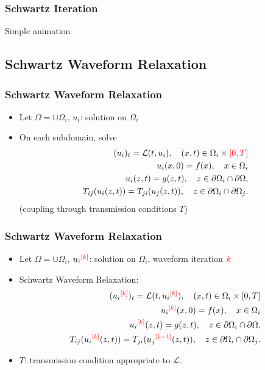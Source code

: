 \documentclass{beamer}
\begin{document}
\begin{frame}
  \frametitle{Schwartz Iteration}
  \vspace*{-0.25in}

  Simple animation

\end{frame}


\subsection{Schwartz Waveform Relaxation}
\begin{frame}
  \frametitle{Schwartz Waveform Relaxation}
  \vspace*{-0.25in}
  \begin{itemize}
  \item Let $\Omega = \cup\Omega_i$, $u_i$: solution on $\Omega_i$
  \item On each subdomain, solve
    \begin{align*}
      (u_i)_t =  \mathcal{L}(t,u_i), \quad (x,t)\in \Omega_i\times{\color{red}[0,T]}\\
      u_i(x,0) = f(x), \quad x \in \Omega_i \\
      u_i(z,t) = g(z,t), \quad z \in \partial\Omega_i\cap\partial\Omega, \\
      {T}_{ij}(u_{i}(z,t)) = {T}_{ji}(u_{j}(z,t)), \quad z \in \partial\Omega_i\cap\partial\Omega_j.
    \end{align*}
    (coupling through transmission conditions $T$)
  \end{itemize}

\end{frame}

\begin{frame}
  \frametitle{Schwartz Waveform Relaxation}
  \vspace*{-0.25in}
  \begin{itemize}
  \item Let $\Omega = \cup\Omega_i$, $u_{\color{black}i}^{\color{red}[k]}\color{black}$: 
    solution on $\Omega_i$, waveform iteration $\color{red}k\color{black}$
  \item \color{red} Schwartz Waveform Relaxation\color{black}:
    \begin{align*}
      (u_{\color{black}i}^{\color{red}[k]}\color{black})_t =  
      \mathcal{L}(t,u_{\color{black}i}^{\color{red}[k]}\color{black}), 
      \quad (x,t)\in \Omega_i\times[0,T]\\
      u_{\color{black}i}^{\color{red}[k]}\color{black}(x,0) = f(x), \quad x \in \Omega_i \\
      u_{\color{black}i}^{\color{red}[k]}\color{black}(z,t) = g(z,t), 
      \quad z \in \partial\Omega_i\cap\partial\Omega, \\
      {T}_{ij}(u_{\color{black}i}^{\color{red}[k]}\color{black}(z,t)) = 
      {T}_{ji}(u_{\color{black}j}^{\color{red}[k-1]}\color{black}(z,t)), 
      \quad z \in \partial\Omega_i\cap\partial\Omega_j.
    \end{align*}
  \item $T$: transmission condition appropriate to $\mathcal{L}$.
  \end{itemize}

\end{frame}
\end{document}
